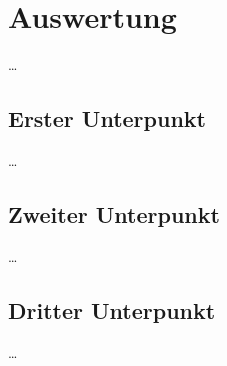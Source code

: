
\section{Auswertung}
\label{sec:Auswertung}

\dots

\subsection{Erster Unterpunkt}
\label{subsec:Auswertung:ErsterUnterpunkt}

\dots

\subsection{Zweiter Unterpunkt}
\label{subsec:Auswertung:ZweiterUnterpunkt}

\dots

\subsection{Dritter Unterpunkt}
\label{subsec:Auswertung:DritterUnterpunkt}

\dots